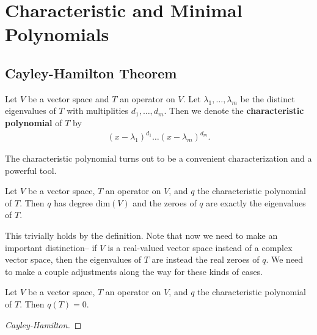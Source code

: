 \documentclass{memoir}
\begin{document}


\section{Characteristic and Minimal Polynomials}
\label{sec:characteristic_and_minimal_polynomials}

\subsection{Cayley-Hamilton Theorem}
\label{subsec:cayley_hamilton_theorem}

\begin{defn}
	Let \(V\) be a vector space and \(T\) an operator on \(V\). Let \(\lambda_1,\ldots,\lambda_m\) be the distinct eigenvalues of \(T\) with multiplities \(d_1,\ldots,d_m\). Then we denote the \textbf{characteristic polynomial} of \(T\) by
	\begin{align*}
		(x-\lambda_1)^{d_1} \ldots (x-\lambda_m)^{d_m}.
	\end{align*}
\end{defn}
The characteristic polynomial turns out to be a convenient characterization and a powerful tool.

\begin{prop}
	Let \(V\) be a vector space, \(T\) an operator on \(V\), and \(q\) the characteristic polynomial of \(T\). Then \(q\) has degree \(\textrm{dim}(V)\) and the zeroes of \(q\) are exactly the eigenvalues of \(T\).
\end{prop}
This trivially holds by the definition. Note that now we need to make an important distinction-- if \(V\) is a real-valued vector space instead of a complex vector space, then the eigenvalues of \(T\) are instead the real zeroes of \(q\). We need to make a couple adjustments along the way for these kinds of cases.

\begin{thm}
	Let \(V\) be a vector space, \(T\) an operator on \(V\), and \(q\) the characteristic polynomial of \(T\). Then \(q(T) = 0\).
\end{thm}

\begin{proof}[Cayley-Hamilton]
	
\end{proof}
\end{document}
